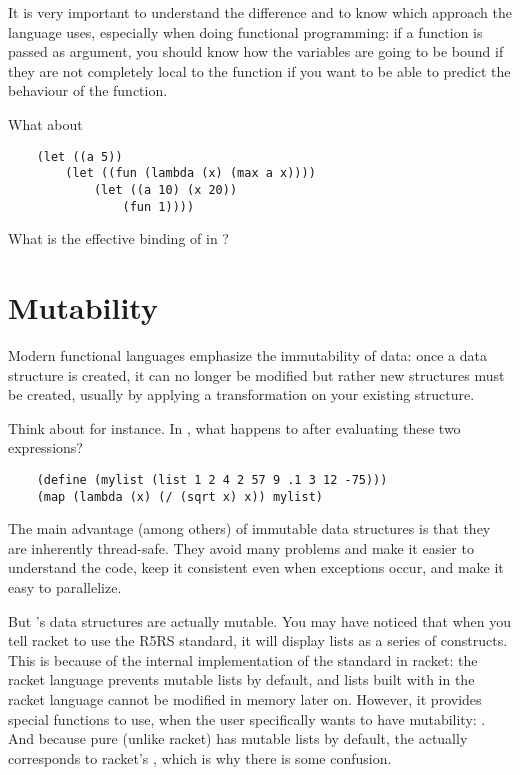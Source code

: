 \documentclass{../../../tp}
\begin{document}
It is very important to understand the difference and to know which approach the language uses, especially when doing functional programming: if a function is passed as argument, you should know how the variables are going to be bound if they are not completely local to the function if you want to be able to predict the behaviour of the function.

\begin{instruction}
	
	What about 
	
	\begin{verbatim}
	(let ((a 5)) 
		(let ((fun (lambda (x) (max a x))))
			(let ((a 10) (x 20))
				(fun 1))))
	\end{verbatim}
	
	What is the effective binding of  in ? 
	
\end{instruction}


\section{Mutability}

Modern functional languages emphasize the immutability of data: once a data structure is created, it can no longer be modified but rather new structures must be created, usually by applying a transformation on your existing structure.

\begin{instruction} 
	Think about  for instance. In \scheme, what happens to  after evaluating these two expressions?
	
	\begin{verbatim}
	(define (mylist (list 1 2 4 2 57 9 .1 3 12 -75)))
	(map (lambda (x) (/ (sqrt x) x)) mylist)
	\end{verbatim}

\end{instruction}

The main advantage (among others) of immutable data structures is that they are inherently thread-safe. They avoid many problems and make it easier to understand the code, keep it consistent even when exceptions occur, and make it easy to parallelize. 

But \scheme's data structures are actually mutable. You may have noticed that when you tell racket to use the R5RS standard, it will display lists as a series of  constructs. This is because of the internal implementation of the \scheme standard in racket: the racket language prevents mutable lists by default, and lists built with  in the racket language cannot be modified in memory later on. However, it provides special functions to use, when the user specifically wants to have mutability: . And because pure \scheme (unlike racket) has mutable lists by default, the \scheme {} actually corresponds to racket's , which is why there is some confusion.
\end{document}
